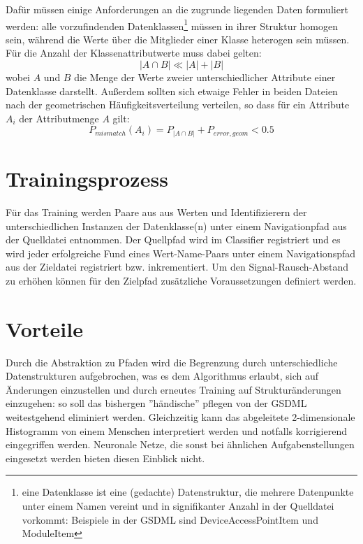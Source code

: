 \documentclass[a4paper,10pt]{article}
\begin{document}
Dafür müssen einige Anforderungen an die zugrunde liegenden Daten formuliert werden: alle vorzufindenden
Datenklassen\footnote{eine Datenklasse ist eine (gedachte) Datenstruktur, die mehrere Datenpunkte unter
einem Namen vereint und in signifikanter Anzahl in der Quelldatei vorkommt: Beispiele in der GSDML sind
DeviceAccessPointItem und ModuleItem} müssen in ihrer Struktur homogen sein, während die Werte über die
Mitglieder einer Klasse heterogen sein müssen. Für die Anzahl der Klassenattributwerte muss dabei gelten:
\begin{displaymath}
 \lvert A \cap B \rvert \ll \lvert A \rvert + \lvert B \rvert
\end{displaymath}
wobei $A$ und $B$ die Menge der Werte zweier unterschiedlicher Attribute einer Datenklasse darstellt.\newline
Außerdem sollten sich etwaige Fehler in beiden Dateien nach der geometrischen Häufigkeitsverteilung
verteilen, so dass für ein Attribute $A_i$ der Attributmenge $A$ gilt:
\begin{displaymath}
 P_{mismatch} (A_i) = P_{\lvert A\cap B\rvert} + P_{error,geom} < 0.5
\end{displaymath}

\section{Trainingsprozess}
Für das Training werden Paare aus aus Werten und Identifizierern der unterschiedlichen Instanzen der
Datenklasse(n) unter einem Navigationpfad aus der Quelldatei entnommen. Der Quellpfad wird im
Classifier registriert und es wird jeder erfolgreiche Fund eines Wert-Name-Paars unter einem
Navigationspfad aus der Zieldatei registriert bzw. inkrementiert. Um den Signal-Rausch-Abstand zu
erhöhen können für den Zielpfad zusätzliche Voraussetzungen definiert werden.

\section{Vorteile}
Durch die Abstraktion zu Pfaden wird die Begrenzung durch unterschiedliche Datenstrukturen aufgebrochen,
was es dem Algorithmus erlaubt, sich auf Änderungen einzustellen und durch erneutes Training auf
Strukturänderungen einzugehen: so soll das bishergen ''händische'' pflegen von der GSDML weitestgehend
eliminiert werden. Gleichzeitig kann das abgeleitete 2-dimensionale Histogramm von einem Menschen
interpretiert werden und notfalls korrigierend eingegriffen werden. Neuronale Netze, die sonst bei
ähnlichen Aufgabenstellungen eingesetzt werden bieten diesen Einblick nicht.
\end{document}
